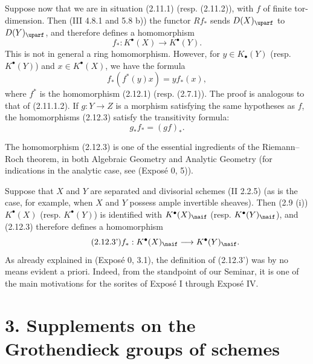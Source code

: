 %
Suppose now that we are in situation (2.11.1) (resp. (2.11.2)), with \(f\) of finite tor-dimension. Then (III 4.8.1 and 5.8 b)) the functor \(Rf_*\) sends \(D(X)_{\uparf}\) to \(D(Y)_{\uparf}\), and therefore defines a homomorphism
\begin{equation}\tag{2.12.3}
 f_*:K^{\bullet}(X)\longrightarrow K^{\bullet}(Y).
\end{equation}
This is not in general a ring homomorphism. However, for \(y\in K_{\bullet}(Y)\) (resp. \(K^{\bullet}(Y)\)) and \(x\in K^{\bullet}(X)\), we have the formula
\begin{equation}\tag{2.12.4}
 f_*(f^*(y)x)=y f_*(x),
\end{equation}
where \(f^*\) is the homomorphism (2.12.1) (resp. (2.7.1)). The proof is analogous to that of (2.11.1.2). If \(g:Y\to Z\) is a morphism satisfying the same hypotheses as \(f\), the homomorphisms (2.12.3) satisfy the transitivity formula:
\begin{equation}\tag{2.12.3.1}
 g_*f_*=(gf)_*.
\end{equation}

The homomorphism (2.12.3) is one of the essential ingredients of the Riemann--Roch theorem, in both Algebraic Geometry and Analytic Geometry (for indications in the analytic case, see (Exposé 0, 5)).

Suppose that \(X\) and \(Y\) are separated and divisorial schemes (II 2.2.5) (as is the case, for example, when \(X\) and \(Y\) possess ample invertible sheaves). Then (2.9 (i)) \(K^{\bullet}(X)\) (resp. \(K^{\bullet}(Y)\)) is identified with \(K^{\bullet}(X)_{\naif}\) (resp. \(K^{\bullet}(Y)_{\naif}\)), and (2.12.3) therefore defines a homomorphism
\begin{equation}\tag{2.12.3'}
 f_*:K^{\bullet}(X)_{\naif}\longrightarrow K^{\bullet}(Y)_{\naif}.
\end{equation}
As already explained in (Exposé 0, 3.1), the definition of (2.12.3') was by no means evident a priori. Indeed, from the standpoint of our Seminar, it is one of the main motivations for the sorites of Exposé I through Exposé IV.

%
\section*{3. Supplements on the Grothendieck groups of schemes\protect{}}

